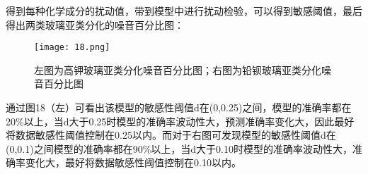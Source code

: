 得到每种化学成分的扰动值，带到模型中进行扰动检验，可以得到敏感阈值，最后得出两类玻璃亚类分化的噪音百分比图：

\begin{figure}[H] 
	\centering %
	\texttt{[image: 18.png]} %
	\caption{左图为高钾玻璃亚类分化噪音百分比图；右图为铅钡玻璃亚类分化噪音百分比图} %
	\label{Fig.main19} %
\end{figure}

通过图18（左）可看出该模型的敏感性阈值d在(0,0.25)之间，模型的准确率都在20\%以上，当d大于0.25时模型的准确率波动性大，预测准确率变化大，因此最好将数据敏感性阈值控制在0.25以内。而对于右图可发现模型的敏感性阈值d在(0,0.1)之间模型的准确率都在90\%以上，当d大于0.10时模型的准确率波动性大，准确率变化大，最好将数据敏感性阈值控制在0.10以内。